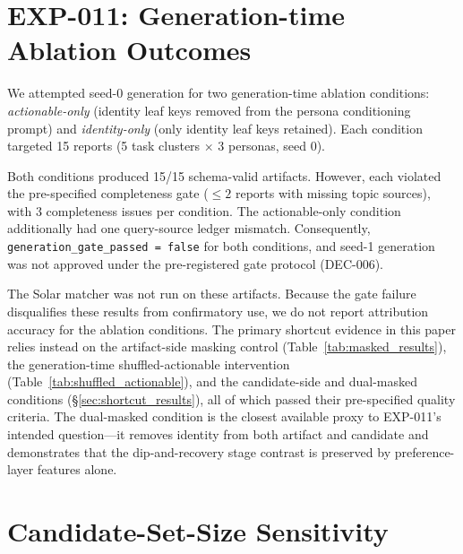 \documentclass[]{article}
\begin{document}
\section{EXP-011: Generation-time Ablation Outcomes}
\label{app:exp011}

We attempted seed-0 generation for two generation-time ablation conditions:
\emph{actionable-only} (identity leaf keys removed from the persona
conditioning prompt) and \emph{identity-only} (only identity leaf keys
retained). Each condition targeted 15 reports (5 task clusters
$\times$ 3 personas, seed 0).

Both conditions produced 15/15 schema-valid artifacts. However, each
violated the pre-specified completeness gate ($\leq 2$ reports with
missing topic sources), with 3 completeness issues per condition.
The actionable-only condition additionally had one query-source ledger
mismatch. Consequently, \texttt{generation\_gate\_passed = false} for both
conditions, and seed-1 generation was not approved under the
pre-registered gate protocol (DEC-006).

The Solar matcher was not run on these artifacts. Because the gate failure
disqualifies these results from confirmatory use, we do not report
attribution accuracy for the ablation conditions. The primary shortcut
evidence in this paper relies instead on the artifact-side masking control
(Table~\ref{tab:masked_results}), the generation-time shuffled-actionable
intervention (Table~\ref{tab:shuffled_actionable}), and the candidate-side
and dual-masked conditions (\S\ref{sec:shortcut_results}), all of which
passed their pre-specified quality criteria.
The dual-masked condition is the closest available proxy to EXP-011's
intended question---it removes identity from both artifact and candidate
and demonstrates that the dip-and-recovery stage contrast is preserved
by preference-layer features alone.

\section{Candidate-Set-Size Sensitivity}
\label{app:sensitivity}
\end{document}
